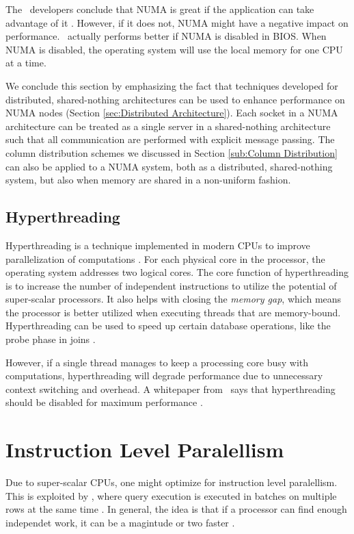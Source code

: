The \qlikview~developers conclude that NUMA is great if the application can take advantage of it \cite{Qlik2013-an}. However, if it does not, NUMA might have a negative impact on performance. \qlikview~actually performs better if NUMA is disabled in BIOS. When NUMA is disabled, the operating system will use the local memory for one CPU at a time.

We conclude this section by emphasizing the fact that techniques developed for distributed, shared-nothing architectures can be used to enhance performance on NUMA nodes \cite{Mukherjee2015-ul} (Section \ref{sec:Distributed Architecture}). Each socket in a NUMA architecture can be treated as a single server in a shared-nothing architecture such that all communication are performed with explicit message passing. The column distribution schemes we discussed in Section \ref{sub:Column Distribution} can also be applied to a NUMA system, both as a distributed, shared-nothing system, but also when memory are shared in a non-uniform fashion.  

\subsection{Hyperthreading}
\label{sub:Hyperthreading}
Hyperthreading is a technique implemented in modern CPUs to improve parallelization of computations \cite{Wikipedia_contributors2015-yx}. For each physical core in the processor, the operating system addresses two logical cores. The core function of hyperthreading is to increase the number of independent instructions to utilize the potential of super-scalar processors. It also helps with closing the \textit{memory gap}, which means the processor is better utilized when executing threads that are memory-bound. Hyperthreading can be used to speed up certain database operations, like the probe phase in joins \cite{Barber2014-ey}.

However, if a single thread manages to keep a processing core busy with computations, hyperthreading will degrade performance due to unnecessary context switching and overhead. A whitepaper from \qlikview~says that hyperthreading should be disabled for maximum performance \cite{Qlik2011-yc}.

\section{Instruction Level Paralellism}
\label{sec:Instruction Level Paralellism}
Due to super-scalar CPUs, one might optimize for instruction level paralellism. This is exploited by \blink, where query execution is executed in batches on multiple rows at the same time \cite{Johnson2008-cp}. In general, the idea is that if a processor can find enough independet work, it can be a magintude or two faster \cite{Boncz2005-wj}.

